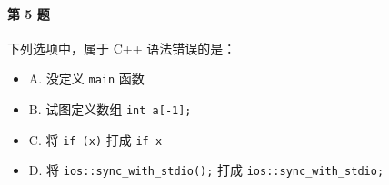 \paragraph{第 5 题} 下列选项中，属于 C++ 语法错误的是：
\begin{itemize}
	\item A. 没定义 \lstinline{main} 函数
	\item B. 试图定义数组 \lstinline{int a[-1];}
	\item C. 将 \lstinline{if (x)} 打成 \lstinline{if x}
	\item D. 将 \lstinline{ios::sync_with_stdio();} 打成 \lstinline{ios::sync_with_stdio;}
\end{itemize}
